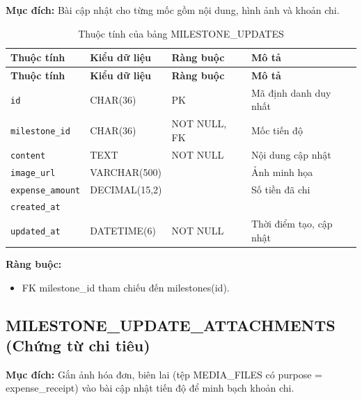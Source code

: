 \textbf{Mục đích:} Bài cập nhật cho từng mốc gồm nội dung, hình ảnh và khoản chi.

{\small
\begin{longtable}{|P{3.2cm}|P{2.8cm}|P{2.2cm}|p{5.4cm}|}
    \caption{Thuộc tính của bảng MILESTONE\_\allowbreak{}UPDATES}
    \label{tab:milestone_updates} \\
    \hline
    \textbf{Thuộc tính} & \textbf{Kiểu dữ liệu} & \textbf{Ràng buộc} & \textbf{Mô tả} \\
    \hline
    \endfirsthead
    \hline
    \textbf{Thuộc tính} & \textbf{Kiểu dữ liệu} & \textbf{Ràng buộc} & \textbf{Mô tả} \\
    \hline
    \endhead

    \texttt{id} & CHAR(36) & PK & Mã định danh duy nhất \\
    \hline
    \texttt{milestone\_\allowbreak{}id} & CHAR(36) & NOT NULL, FK & Mốc tiến độ \\
    \hline
    \texttt{content} & TEXT & NOT NULL & Nội dung cập nhật \\
    \hline
    \texttt{image\_\allowbreak{}url} & VARCHAR(500) &  & Ảnh minh họa \\
    \hline
    \texttt{expense\_\allowbreak{}amount} & DECIMAL(15,2) &  & Số tiền đã chi \\
    \hline
    \texttt{created\_\allowbreak{}at} &  &  &  \\
    \hline
    \texttt{updated\_\allowbreak{}at} & DATETIME(6) & NOT NULL & Thời điểm tạo, cập nhật \\
    \hline
\end{longtable}
}

\textbf{Ràng buộc:}
\begin{itemize}
    \item FK milestone\_\allowbreak{}id tham chiếu đến milestones(id).
\end{itemize}

\subsection{MILESTONE\_\allowbreak{}UPDATE\_\allowbreak{}ATTACHMENTS (Chứng từ chi tiêu)}

\textbf{Mục đích:} Gắn ảnh hóa đơn, biên lai (tệp MEDIA\_\allowbreak{}FILES có purpose = expense\_\allowbreak{}receipt) vào bài cập nhật tiến độ để minh bạch khoản chi.

